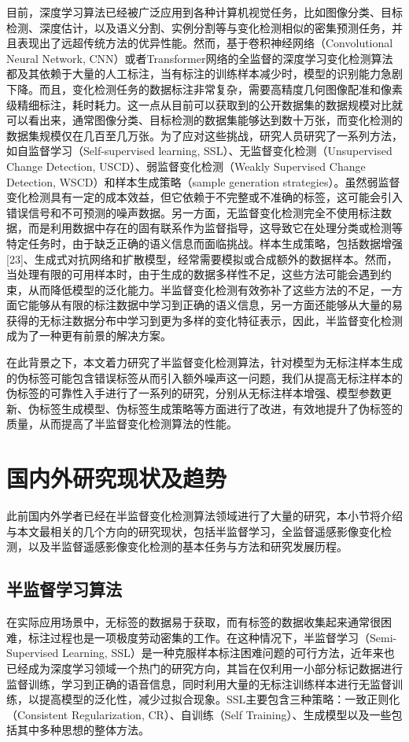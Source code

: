 \documentclass[lang=chs, degree=master, blindreview=false, adobe=false]{yanputhesis}
\begin{document}
目前，深度学习算法已经被广泛应用到各种计算机视觉任务，比如图像分类、目标检测、深度估计，以及语义分割、实例分割等与变化检测相似的密集预测任务，并且表现出了远超传统方法的优异性能。然而，基于卷积神经网络（Convolutional Neural Network, CNN）或者Transformer网络的全监督的深度学习变化检测算法都及其依赖于大量的人工标注，当有标注的训练样本减少时，模型的识别能力急剧下降。而且，变化检测任务的数据标注非常复杂，需要高精度几何图像配准和像素级精细标注，耗时耗力。这一点从目前可以获取到的公开数据集的数据规模对比就可以看出来，通常图像分类、目标检测的数据集能够达到数十万张，而变化检测的数据集规模仅在几百至几万张。为了应对这些挑战，研究人员研究了一系列方法，如自监督学习（Self-supervised learning, SSL）、无监督变化检测（Unsupervised Change Detection, USCD）、弱监督变化检测（Weakly Supervised Change Detection, WSCD）和样本生成策略（sample generation strategies）。虽然弱监督变化检测具有一定的成本效益，但它依赖于不完整或不准确的标签，这可能会引入错误信号和不可预测的噪声数据。另一方面，无监督变化检测完全不使用标注数据，而是利用数据中存在的固有联系作为监督指导，这导致它在处理分类或检测等特定任务时，由于缺乏正确的语义信息而面临挑战。样本生成策略，包括数据增强[23]、生成式对抗网络和扩散模型，经常需要模拟或合成额外的数据样本。然而，当处理有限的可用样本时，由于生成的数据多样性不足，这些方法可能会遇到约束，从而降低模型的泛化能力。半监督变化检测有效弥补了这些方法的不足，一方面它能够从有限的标注数据中学习到正确的语义信息，另一方面还能够从大量的易获得的无标注数据分布中学习到更为多样的变化特征表示，因此，半监督变化检测成为了一种更有前景的解决方案。

在此背景之下，本文着力研究了半监督变化检测算法，针对模型为无标注样本生成的伪标签可能包含错误标签从而引入额外噪声这一问题，我们从提高无标注样本的伪标签的可靠性入手进行了一系列的研究，分别从无标注样本增强、模型参数更新、伪标签生成模型、伪标签生成策略等方面进行了改进，有效地提升了伪标签的质量，从而提高了半监督变化检测算法的性能。

\section{国内外研究现状及趋势}
此前国内外学者已经在半监督变化检测算法领域进行了大量的研究，本小节将介绍与本文最相关的几个方向的研究现状，包括半监督学习，全监督遥感影像变化检测，以及半监督遥感影像变化检测的基本任务与方法和研究发展历程。
\subsection{半监督学习算法}
在实际应用场景中，无标签的数据易于获取，而有标签的数据收集起来通常很困难，标注过程也是一项极度劳动密集的工作。在这种情况下，半监督学习（Semi-Supervised Learning, SSL）是一种克服样本标注困难问题的可行方法，近年来也已经成为深度学习领域一个热门的研究方向，其旨在仅利用一小部分标记数据进行监督训练，学习到正确的语音信息，同时利用大量的无标注训练样本进行无监督训练，以提高模型的泛化性，减少过拟合现象。SSL主要包含三种策略：一致正则化（Consistent Regularization, CR）、自训练（Self Training）、生成模型以及一些包括其中多种思想的整体方法。
\end{document}
